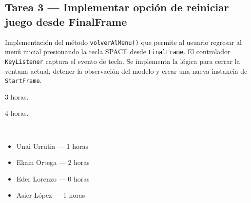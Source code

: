 \documentclass[12pt, a4paper]{article}
\begin{document}
\vspace{0.8em}

\subsection*{Tarea 3 — Implementar opción de reiniciar juego desde FinalFrame}
\begin{description}[leftmargin=2em, style=nextline]
    \item[\textbf{Descripción:}] Implementación del método \texttt{volverAlMenu()} que permite al usuario regresar al menú inicial presionando la tecla SPACE desde \texttt{FinalFrame}. El controlador \texttt{KeyListener} captura el evento de tecla. Se implementa la lógica para cerrar la ventana actual, detener la observación del modelo y crear una nueva instancia de \texttt{StartFrame}.
    \item[\textbf{Tiempo estimado:}] 3 horas.
    \item[\textbf{Tiempo real:}] 4 horas.
    \item[\textbf{Responsables y dedicación:}]~
        \begin{itemize}[leftmargin=1em, nosep]
            \item Unai Urrutia — 1 horas
            \item Ekain Ortega — 2 horas
            \item Eder Lorenzo — 0 horas
            \item Asier López — 1 horas
        \end{itemize}
\end{description}

\vspace{0.8em}

\end{document}
